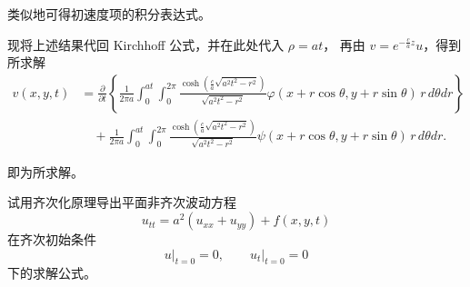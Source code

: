 \begin{solution}
类似地可得初速度项的积分表达式。

现将上述结果代回 Kirchhoff 公式，并在此处代入 $\rho=at$，
再由 $v=e^{-\frac{c}{a}z}u$，得到所求解
\[
\boxed{
\begin{aligned}
v(x,y,t)
&=
\frac{\partial}{\partial t}
\left\{
\frac{1}{2\pi a}
\int_{0}^{at}\!\!\int_{0}^{2\pi}
\frac{\cosh\!\left(\tfrac{c}{a}\sqrt{a^{2}t^{2}-r^{2}}\right)}
{\sqrt{a^{2}t^{2}-r^{2}}}
\varphi(x+r\cos\theta,y+r\sin\theta)\,
r\,d\theta dr
\right\}
\\[4pt]
&\quad+
\frac{1}{2\pi a}
\int_{0}^{at}\!\!\int_{0}^{2\pi}
\frac{\cosh\!\left(\tfrac{c}{a}\sqrt{a^{2}t^{2}-r^{2}}\right)}
{\sqrt{a^{2}t^{2}-r^{2}}}
\psi(x+r\cos\theta,y+r\sin\theta)\,
r\,d\theta dr.
\end{aligned}
}
\]

即为所求解。
\end{solution}
\begin{homework}[6]
试用齐次化原理导出平面非齐次波动方程
\[
u_{tt}=a^{2}(u_{xx}+u_{yy})+f(x,y,t)
\]
在齐次初始条件
\[
u\big|_{t=0}=0,\qquad u_{t}\big|_{t=0}=0
\]
下的求解公式。
\end{homework}
